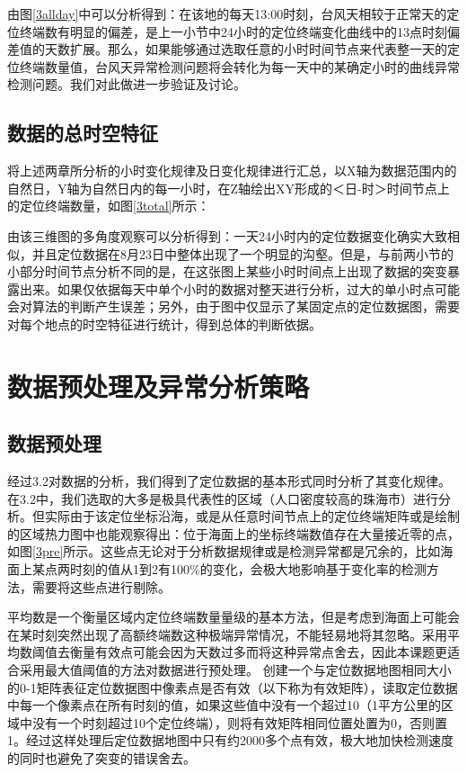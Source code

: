 \documentclass[a4paper,AutoFakeBold,oneside,12pt]{book}
\begin{document}
{{

	由图\ref{3allday}中可以分析得到：在该地的每天13:00时刻，台风天相较于正常天的定位终端数有明显的偏差，是上一小节中24小时的定位终端变化曲线中的13点时刻偏差值的天数扩展。那么，如果能够通过选取任意的小时时间节点来代表整一天的定位终端数量值，台风天异常检测问题将会转化为每一天中的某确定小时的曲线异常检测问题。我们对此做进一步验证及讨论。

\subsection{数据的总时空特征}
	将上述两章所分析的小时变化规律及日变化规律进行汇总，以X轴为数据范围内的自然日，Y轴为自然日内的每一小时，在Z轴绘出XY形成的＜日-时＞时间节点上的定位终端数量，如图\ref{3total}所示：


	由该三维图的多角度观察可以分析得到：一天24小时内的定位数据变化确实大致相似，并且定位数据在8月23日中整体出现了一个明显的沟壑。但是，与前两小节的小部分时间节点分析不同的是，在这张图上某些小时时间点上出现了数据的突变暴露出来。如果仅依据每天中单个小时的数据对整天进行分析，过大的单小时点可能会对算法的判断产生误差；另外，由于图中仅显示了某固定点的定位数据图，需要对每个地点的时空特征进行统计，得到总体的判断依据。

\section{数据预处理及异常分析策略}

\subsection{数据预处理}
	经过3.2对数据的分析，我们得到了定位数据的基本形式同时分析了其变化规律。在3.2中，我们选取的大多是极具代表性的区域（人口密度较高的珠海市）进行分析。但实际由于该定位坐标沿海，或是从任意时间节点上的定位终端矩阵或是绘制的区域热力图中也能观察得出：位于海面上的坐标终端数值存在大量接近零的点，如图\ref{3pre}所示。这些点无论对于分析数据规律或是检测异常都是冗余的，比如海面上某点两时刻的值从1到2有100\%的变化，会极大地影响基于变化率的检测方法，需要将这些点进行剔除。


	平均数是一个衡量区域内定位终端数量量级的基本方法，但是考虑到海面上可能会在某时刻突然出现了高额终端数这种极端异常情况，不能轻易地将其忽略。采用平均数阈值去衡量有效点可能会因为天数过多而将这种异常点舍去，因此本课题更适合采用最大值阈值的方法对数据进行预处理。
	创建一个与定位数据地图相同大小的0-1矩阵表征定位数据图中像素点是否有效（以下称为有效矩阵），读取定位数据中每一个像素点在所有时刻的值，如果这些值中没有一个超过10（1平方公里的区域中没有一个时刻超过10个定位终端），则将有效矩阵相同位置处置为0，否则置1。经过这样处理后定位数据地图中只有约2000多个点有效，极大地加快检测速度的同时也避免了突变的错误舍去。

}}
\end{document}
